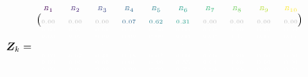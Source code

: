 
\[
\design_k = \tiny\begin{blockarray}{cccccccccc}
\color[HTML]{440154}B_{1} & \color[HTML]{482878}B_{2} & \color[HTML]{3E4A89}B_{3} & \color[HTML]{31688E}B_{4} & \color[HTML]{26828E}B_{5} & \color[HTML]{1F9E89}B_{6} & \color[HTML]{35B779}B_{7} & \color[HTML]{6DCD59}B_{8} & \color[HTML]{B4DE2C}B_{9} & \color[HTML]{FDE725}B_{10} \\
\begin{block}{(cccccccccc)}
\phantom{x}\\
\color{lightgray}0.00 & \color{lightgray}0.00 & \color{lightgray}0.00 & \color[HTML]{31688E}0.07 & \color[HTML]{26828E}0.62 & \color[HTML]{1F9E89}0.31 & \color{lightgray}0.00 & \color{lightgray}0.00 & \color{lightgray}0.00 & \color{lightgray}0.00\color{black}\\
\end{block}
\color{white}0.00 & \color{white}0.20 & \color{white}0.66 & \color{white}0.14 & \color{white}0.00 & \color{white}0.00 & \color{white}0.00 & \color{white}0.00 & \color{white}0.00 & \color{white}0.00\color{black}\\
  \color{white}0.00 & \color{white}0.00 & \color{white}0.00 & \color{white}0.00 & \color{white}0.00 & \color{white}0.00 & \color{white}0.00 & \color{white}0.17 & \color{white}0.67 & \color{white}0.17\color{black}\\
  \color{white}\vdots & \color{white}\vdots & \color{white}\vdots & \color{white}\vdots & \color{white}\vdots & \color{white}\vdots & \color{white}\vdots & \color{white}\vdots & \color{white}\vdots & \color{white}\vdots\\
  \color{white}0.00 & \color{white}0.02 & \color{white}0.48 & \color{white}0.48 & \color{white}0.02 & \color{white}0.00 & \color{white}0.00 & \color{white}0.00 & \color{white}0.00 & \color{white}0.00\color{black}\\
  \color{white}0.00 & \color{white}0.00 & \color{white}0.00 & \color{white}0.01 & \color{white}0.40 & \color{white}0.55 & \color{white}0.04 & \color{white}0.00 & \color{white}0.00 & \color{white}0.00\color{black}\\
  \color{white}0.00 & \color{white}0.00 & \color{white}0.00 & \color{white}0.00 & \color{white}0.00 & \color{white}0.29 & \color{white}0.63 & \color{white}0.08 & \color{white}0.00 & \color{white}0.00\color{black}\\
\phantom{x}
\end{blockarray}
\]
\normalsize
